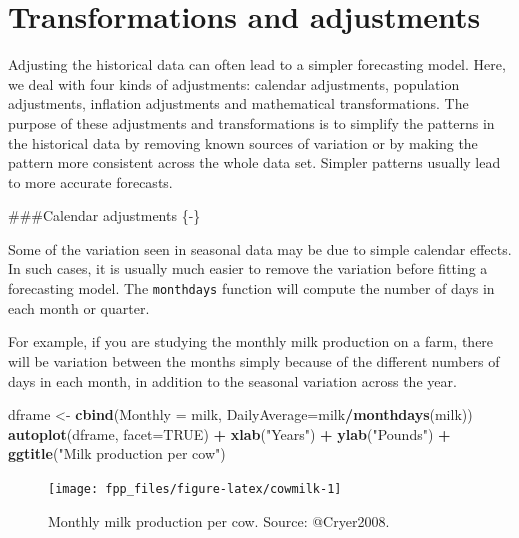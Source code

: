 \documentclass[]{book}
\newenvironment{Shaded}{\begin{snugshade}}{\end{snugshade}}
\newcommand{\DataTypeTok}[1]{\textcolor[rgb]{0.13,0.29,0.53}{#1}}
\newcommand{\KeywordTok}[1]{\textcolor[rgb]{0.13,0.29,0.53}{\textbf{#1}}}
\newcommand{\NormalTok}[1]{#1}
\newcommand{\OperatorTok}[1]{\textcolor[rgb]{0.81,0.36,0.00}{\textbf{#1}}}
\newcommand{\OtherTok}[1]{\textcolor[rgb]{0.56,0.35,0.01}{#1}}
\newcommand{\StringTok}[1]{\textcolor[rgb]{0.31,0.60,0.02}{#1}}
\begin{document}
\hypertarget{sec-transformations}{%
\section{Transformations and adjustments}\label{sec-transformations}}

Adjusting the historical data can often lead to a simpler forecasting model. Here, we deal with four kinds of adjustments: calendar adjustments, population adjustments, inflation adjustments and mathematical transformations. The purpose of these adjustments and transformations is to simplify the patterns in the historical data by removing known sources of variation or by making the pattern more consistent across the whole data set. Simpler patterns usually lead to more accurate forecasts.

\#\#\#Calendar adjustments \{-\}

Some of the variation seen in seasonal data may be due to simple calendar effects. In such cases, it is usually much easier to remove the variation before fitting a forecasting model. The \texttt{monthdays} function will compute the number of days in each month or quarter.

For example, if you are studying the monthly milk production on a farm, there will be variation between the months simply because of the different numbers of days in each month, in addition to the seasonal variation across the year.

\begin{Shaded}
\begin{Highlighting}[]
\NormalTok{dframe <-}\StringTok{ }\KeywordTok{cbind}\NormalTok{(}\DataTypeTok{Monthly =}\NormalTok{ milk, }\DataTypeTok{DailyAverage=}\NormalTok{milk}\OperatorTok{/}\KeywordTok{monthdays}\NormalTok{(milk)) }
  \KeywordTok{autoplot}\NormalTok{(dframe, }\DataTypeTok{facet=}\OtherTok{TRUE}\NormalTok{) }\OperatorTok{+}\StringTok{ }\KeywordTok{xlab}\NormalTok{(}\StringTok{"Years"}\NormalTok{) }\OperatorTok{+}\StringTok{ }\KeywordTok{ylab}\NormalTok{(}\StringTok{"Pounds"}\NormalTok{) }\OperatorTok{+}
\StringTok{    }\KeywordTok{ggtitle}\NormalTok{(}\StringTok{"Milk production per cow"}\NormalTok{)}
\end{Highlighting}
\end{Shaded}

\begin{figure}

{\centering \texttt{[image: fpp\_files/figure-latex/cowmilk-1]} 

}

\caption{Monthly milk production per cow. Source: @Cryer2008.}\label{fig:cowmilk}
\end{figure}
\end{document}
